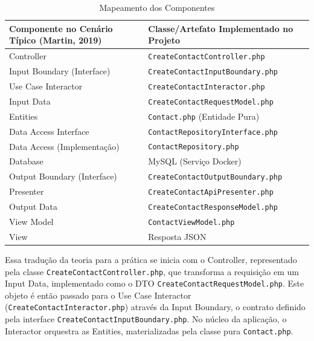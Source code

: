         \begin{table}[H]
            \caption{Mapeamento dos Componentes}
            \label{tab:mapeamento_clean_arch}
            \begin{tabularx}{\linewidth}{|l|X|} %
                \toprule
                {\small \textbf{Componente no Cenário Típico (Martin, 2019)}} & {\small \textbf{Classe/Artefato Implementado no Projeto}} \\
                \midrule
                Controller                  & \texttt{CreateContactController.php} \\
                Input Boundary (Interface)  & \texttt{CreateContactInputBoundary.php} \\
                Use Case Interactor         & \texttt{CreateContactInteractor.php} \\
                Input Data                  & \texttt{CreateContactRequestModel.php} \\
                Entities                    & \texttt{Contact.php} (Entidade Pura) \\
                Data Access Interface       & \texttt{ContactRepositoryInterface.php} \\
                Data Access (Implementação) & \texttt{ContactRepository.php} \\
                Database                    & MySQL (Serviço Docker) \\
                Output Boundary (Interface) & \texttt{CreateContactOutputBoundary.php} \\
                Presenter                   & \texttt{CreateContactApiPresenter.php} \\
                Output Data                 & \texttt{CreateContactResponseModel.php} \\
                View Model                  & \texttt{ContactViewModel.php} \\
                View                        & Resposta JSON \\
                \bottomrule
            \end{tabularx}
        \end{table}
       
        \par Essa tradução da teoria para a prática se inicia com o Controller, representado pela classe \texttt{CreateContactController.php}, que transforma a requisição em um Input Data, implementado como o DTO \texttt{CreateContactRequestModel.php}. Este objeto é então passado para o Use Case Interactor (\texttt{CreateContactInteractor.php}) através da Input Boundary, o contrato definido pela interface \texttt{CreateContactInputBoundary.php}. No núcleo da aplicação, o Interactor orquestra as Entities, materializadas pela classe pura \texttt{Contact.php}. 
        
